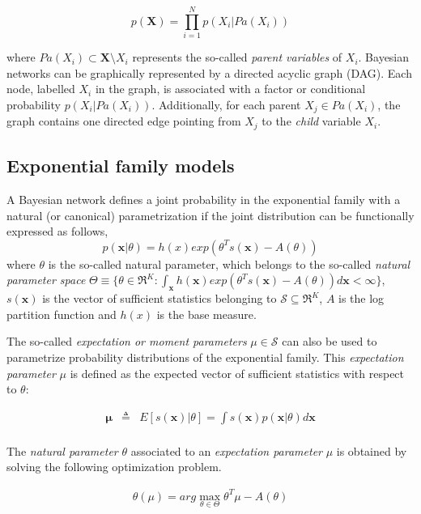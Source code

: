 \documentclass[11pt, oneside]{article}   	%
\newcommand{\bm}{\mathbf}
\numberwithin{figure}{section}
\numberwithin{equation}{section}
\numberwithin{table}{section}
\newcommand{\e}[1]{E\left[ #1 \right]}
\theoremstyle{definition}
\begin{document}
$$ p(\bm X) = \prod_{i=1}^N p(X_i|Pa(X_i))$$ 

\noindent where $Pa(X_i)\subset \bm X\setminus X_i$ represents the so-called \emph{parent variables} of $X_i$. Bayesian networks can be graphically represented by a directed acyclic graph (DAG). Each node, labelled $X_i$ in the graph, is associated with a factor or conditional probability $p(X_i|Pa(X_i))$. Additionally, for each parent $X_j \in Pa(X_i)$, the graph contains one directed edge pointing from $X_j$ to the \emph{child} variable $X_i$.

\subsection*{Exponential family models}

A Bayesian network defines a joint probability in the exponential family with a natural (or canonical) parametrization if the joint distribution can be functionally expressed as follows, 
\begin{equation}
\label{Equation:EFCanonical}
p(\bm x |\theta) = h(x) exp(\theta^Ts(\bm x) -
A(\theta) )
\end{equation}
\noindent where $\theta$ is the so-called natural parameter, which belongs to the so-called \emph{natural parameter space}
$\Theta \equiv \{ \theta \in\Re^K: \int_{\bm x} h(\bm x) exp(\theta^T s(\bm x) -
A(\theta) ) d\bm x < \infty \}$, $s(\bm x)$ is the vector of sufficient statistics belonging to $\mathcal{S} \subseteq\Re^K$, $A$ is the log partition function and $h(x)$ is the base measure. 

The so-called \emph{expectation or moment parameters} $\mu\in\mathcal{S}$ can also be used to parametrize probability
distributions of the exponential family. This \emph{expectation parameter} $\mu$ is defined as the expected vector of sufficient statistics with respect to $\theta$:

\begin{equation}
\label{Equation:NaturalToMoment}
\begin{array}{lll}
\bm \mu & \triangleq & \e{s(\bm x)|\theta}  = \int s(\bm x)p(\bm x|\theta)
d\bm x\\
\end{array}
\end{equation}

The \emph{natural parameter} $\theta$ associated to
an \emph{expectation parameter} $\mu$ is obtained by solving the following optimization 
problem.
 
\begin{eqnarray}
\label{Equation:MomentToNatural}
\theta(\mu) = arg\max_{\theta\in\Theta} \theta^T\mu
-A(\theta)
\end{eqnarray}
\end{document}
